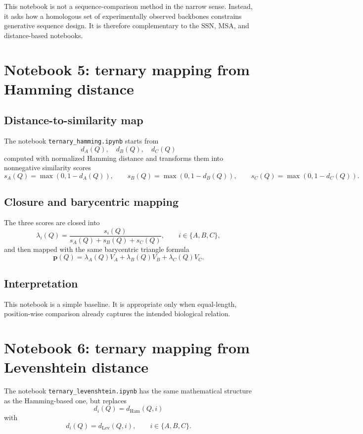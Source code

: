 \documentclass[11pt,a4paper]{article}
\begin{document}
This notebook is not a sequence-comparison method in the narrow sense. Instead, it asks how a homologous set of experimentally observed backbones constrains generative sequence design. It is therefore complementary to the SSN, MSA, and distance-based notebooks.

\section{Notebook 5: ternary mapping from Hamming distance}

\subsection{Distance-to-similarity map}

The notebook \texttt{ternary\_hamming.ipynb} starts from
\[
d_A(Q),\quad d_B(Q),\quad d_C(Q)
\]
computed with normalized Hamming distance and transforms them into nonnegative similarity scores
\[
s_A(Q)=\max(0,1-d_A(Q)),\qquad
s_B(Q)=\max(0,1-d_B(Q)),\qquad
s_C(Q)=\max(0,1-d_C(Q)).
\]

\subsection{Closure and barycentric mapping}

The three scores are closed into
\[
\lambda_i(Q)=\frac{s_i(Q)}{s_A(Q)+s_B(Q)+s_C(Q)},\qquad i\in\{A,B,C\},
\]
and then mapped with the same barycentric triangle formula
\[
\bm{p}(Q)=\lambda_A(Q)V_A+\lambda_B(Q)V_B+\lambda_C(Q)V_C.
\]

\subsection{Interpretation}

This notebook is a simple baseline. It is appropriate only when equal-length, position-wise comparison already captures the intended biological relation.

\section{Notebook 6: ternary mapping from Levenshtein distance}

The notebook \texttt{ternary\_levenshtein.ipynb} has the same mathematical structure as the Hamming-based one, but replaces
\[
d_i(Q)=d_{\mathrm{Ham}}(Q,i)
\]
with
\[
d_i(Q)=d_{\mathrm{Lev}}(Q,i),\qquad i\in\{A,B,C\}.
\]
\end{document}
